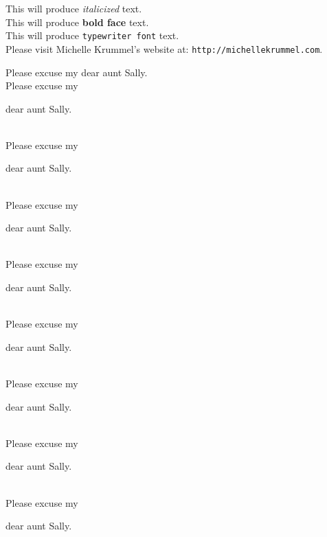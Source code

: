 \documentclass[12pt]{article}
\begin{document}
	\leavevmode
	
	This will produce \textit{italicized} text.\\
	
	This will produce \textbf{bold face} text.\\
	
	This will produce \texttt{typewriter font} text.\\
	
	Please visit Michelle Krummel's website at: \texttt{http://michellekrummel.com}.
	
	\vspace{1cm}
	
	Please excuse my dear aunt Sally.\\
	
	Please excuse my \begin{large}
		dear aunt Sally.
	\end{large}\\
	
	Please excuse my \begin{Large}
		dear aunt Sally.
	\end{Large}\\
	
	Please excuse my \begin{huge}
		dear aunt Sally.
	\end{huge}\\
	
	Please excuse my \begin{Huge}
		dear aunt Sally.
	\end{Huge}\\
	
	Please excuse my \begin{normalsize}
		dear aunt Sally.
	\end{normalsize}\\
	
	Please excuse my \begin{small}
		dear aunt Sally.
	\end{small}\\
	
	Please excuse my \begin{scriptsize}
		dear aunt Sally.
	\end{scriptsize}\\
	
	Please excuse my \begin{tiny}
		dear aunt Sally.
	\end{tiny}
	
	\vspace{1cm}
	
\end{document}
